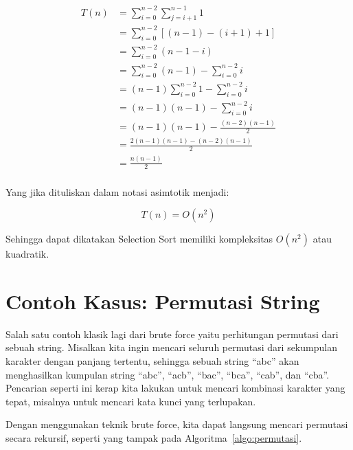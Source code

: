 \begin{equation}\label{eq:selection-kompleksitas}
    \begin{aligned}
        T(n) & = \sum\limits_{i=0}^{n-2} \sum\limits_{j=i+1}^{n-1} 1 \\
             & = \sum\limits_{i=0}^{n-2} [(n - 1) - (i + 1) + 1] \\
             & = \sum\limits_{i=0}^{n-2} (n - 1 - i) \\
             & = \sum\limits_{i=0}^{n-2} (n - 1) - \sum\limits_{i=0}^{n-2} i \\
             & = (n - 1) \sum\limits_{i=0}^{n-2} 1 - \sum\limits_{i=0}^{n-2} i \\
             & = (n - 1)(n - 1) - \sum\limits_{i=0}^{n-2} i \\
             & = (n - 1)(n - 1) - \frac{(n - 2)(n - 1)}{2} \\
             & = \frac{2(n - 1)(n - 1) - (n - 2)(n - 1)}{2} \\
             & = \frac{n(n - 1)}{2} \\
    \end{aligned}
\end{equation}

Yang jika dituliskan dalam notasi asimtotik menjadi:

\begin{equation}\label{eq:selection-kompleksitas-final}
    T(n) = O(n^2)
\end{equation}

Sehingga dapat dikatakan Selection Sort memiliki kompleksitas $O(n^2)$ atau kuadratik.

\section{Contoh Kasus: Permutasi String}

Salah satu contoh klasik lagi dari brute force yaitu perhitungan permutasi dari sebuah string. Misalkan kita ingin mencari seluruh permutasi dari sekumpulan karakter dengan panjang tertentu, sehingga sebuah string ``abc'' akan menghasilkan kumpulan string ``abc'', ``acb'', ``bac'', ``bca'', ``cab'', dan ``cba''. Pencarian seperti ini kerap kita lakukan untuk mencari kombinasi karakter yang tepat, misalnya untuk mencari kata kunci yang terlupakan.

Dengan menggunakan teknik brute force, kita dapat langsung mencari permutasi secara rekursif, seperti yang tampak pada Algoritma~\ref{algo:permutasi}.

